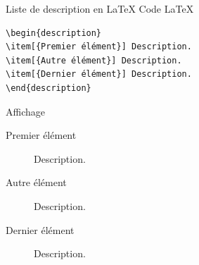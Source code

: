 \documentclass[presentation,t]{beamer}
\begin{document}
\begin{frame}[fragile,label={sec:org4a213a3}]{Liste de description en \LaTeX{}}
 Code \LaTeX{}

\lstset{language=[LaTeX]TeX,label= ,caption= ,captionpos=b,numbers=none}
\begin{lstlisting}
\begin{description}
\item[{Premier élément}] Description.
\item[{Autre élément}] Description.
\item[{Dernier élément}] Description.
\end{description}
\end{lstlisting}

\pause{}

Affichage

\begin{mdframed}
\begin{description}
\item[{Premier élément}] Description.
\item[{Autre élément}] Description.
\item[{Dernier élément}] Description.
\end{description}

\end{mdframed}
\end{frame}
\end{document}
